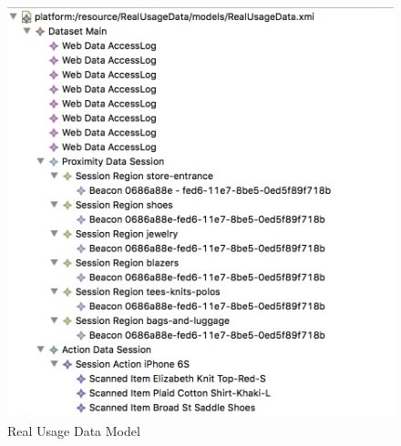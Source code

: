 \vspace{0.5cm}
\begin{figure}[H]
  \centering
    \includegraphics[height=12cm]{images/diagrams/RealUsageDataModel.png}
  \caption{Real Usage Data Model}
  \label{fig:real-usage-data-model}
\end{figure}
\vspace{0.5cm}

